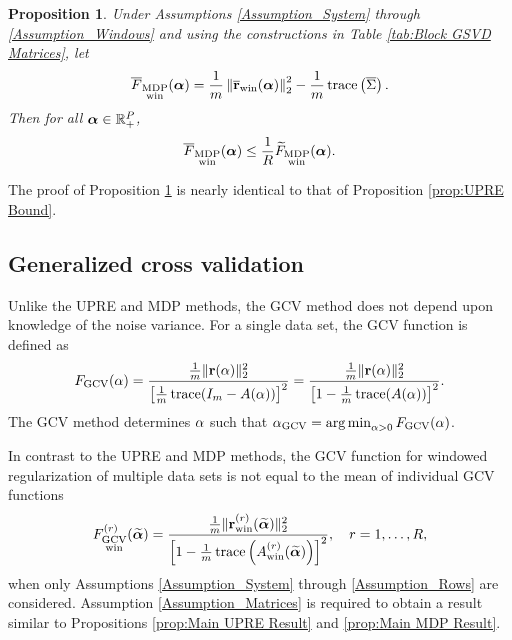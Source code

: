 \documentclass[12pt]{article}
\newtheorem{proposition}{Proposition}[section]
\begin{document}
\begin{proposition}
\label{prop:MDP Bound}
Under Assumptions \ref{Assumption_System} through \ref{Assumption_Windows} and using the constructions in Table \ref{tab:Block GSVD Matrices}, let
\begin{equation}
\overline{F}_{\substack{\text{MDP} \\ \text{win}}}(\bm{\alpha}) = \frac{1}{m}\left\|\overline{\mathbf{r}}_{\text{win}}(\bm{\alpha})\right\|_2^2 - \frac{1}{m} \operatorname{trace}\left(\overline{\Sigma}\right).
\end{equation}
Then for all $\bm{\alpha} \in \mathbb{R}_{+}^{P}$,
\begin{equation}
\label{eq:MDP Bound}
\overline{F}_{\substack{\text{MDP} \\ \text{win}}}(\bm{\alpha}) \leq \frac{1}{R}\widetilde{F}_{\substack{\text{MDP} \\ \text{win}}}(\bm{\alpha}).
\end{equation}
\end{proposition}
\noindent The proof of Proposition \ref{prop:MDP Bound} is nearly identical to that of Proposition \ref{prop:UPRE Bound}.

\subsection{Generalized cross validation} \label{sec:GCV}
Unlike the UPRE and MDP methods, the GCV method does not depend upon knowledge of the noise variance. For a single data set, the GCV function is defined as
\begin{equation}
\label{eq:GCV}
F_{\text{GCV}}(\alpha) = \frac{\frac{1}{m}\|\mathbf{r}(\alpha)\|_2^2}{\left[\frac{1}{m}\operatorname{trace}(I_{m} - A(\alpha))\right]^2} = \frac{\frac{1}{m}\|\mathbf{r}(\alpha)\|_2^2}{\left[1 - \frac{1}{m}\operatorname{trace}(A(\alpha))\right]^2}.
\end{equation}
The GCV method determines $\alpha$ such that $\alpha_{\text{GCV}} = \operatorname*{arg\,min}_{\alpha > 0} F_{\text{GCV}}(\alpha)$. \par
In contrast to the UPRE and MDP methods, the GCV function for windowed regularization of multiple data sets is not equal to the mean of individual GCV functions
\begin{equation}
\label{eq:Individual GCV}
F_{\substack{\text{GCV} \\ \text{win}}}^{(r)}(\widetilde{\bm{\alpha}}) = \frac{\frac{1}{m}\|\mathbf{r}_{\text{win}}^{(r)}(\widetilde{\bm{\alpha}})\|_2^2}{\left[1 - \frac{1}{m}\operatorname{trace}\left(A_{\text{win}}^{(r)}(\widetilde{\bm{\alpha}})\right)\right]^2}, \quad r = 1,\ldots,R,
\end{equation}
when only Assumptions \ref{Assumption_System} through \ref{Assumption_Rows} are considered. Assumption \ref{Assumption_Matrices} is required to obtain a result similar to Propositions \ref{prop:Main UPRE Result} and \ref{prop:Main MDP Result}.
\end{document}
